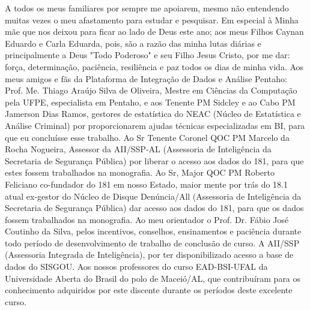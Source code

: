 

\begin{agradecimento}

A todos os meus familiares por sempre me apoiarem, mesmo não entendendo muitas vezes o meu afastamento para estudar e pesquisar. Em especial à Minha mãe que nos deixou para ficar ao lado de Deus este ano; aos meus Filhos Caynan Eduardo e Carla Eduarda, pois, são a razão das minha lutas diárias e principalmente a Deus "Todo Poderoso" e seu Filho Jesus Cristo, por me dar: força, determinação, paciência, resiliência e paz todos os dias de minha vida.
Aos meus amigos e fãs da Plataforma de Integração de Dados e Análise Pentaho: Prof. Me. Thiago Araújo Silva de Oliveira, Mestre em Ciências da Computação pela UFPE, especialista em Pentaho, e aos Tenente PM Sidcley e ao Cabo PM Jamerson Dias Ramos, gestores de estatística do NEAC (Núcleo de Estatística e Análise Criminal) por proporcionarem ajudas técnicas especializadas em BI, para que eu concluísse esse trabalho.
Ao Sr Tenente Coronel QOC PM Marcelo da Rocha Nogueira, Assessor da AII/SSP-AL (Assessoria de Inteligência da Secretaria de Segurança Pública)  por liberar o acesso aos dados do 181, para que estes fossem trabalhados na monografia.
Ao Sr, Major QOC PM Roberto Feliciano co-fundador do 181 em nosso Estado, maior mente por trás do 18.1 atual ex-gestor do Núcleo de Disque Denúncia/All (Assessoria de Inteligência da Secretaria de Segurança Pública)  dar acesso aos dados do 181, para que os dados fossem trabalhados na monografia.
Ao meu orientador o Prof. Dr. Fábio José Coutinho da Silva, pelos incentivos, conselhos, ensinamentos e paciência durante todo período de desenvolvimento de trabalho de conclusão de curso.
A AII/SSP (Assessoria Integrada de Inteligência),  por ter disponibilizado acesso a base de dados do SISGOU.
Aos nossos professores do curso EAD-BSI-UFAL da Universidade Aberta do Brasil do polo de Maceió/AL, que contribuíram para os conhecimento adquiridos por este discente durante os períodos deste excelente curso.


\end{agradecimento}

